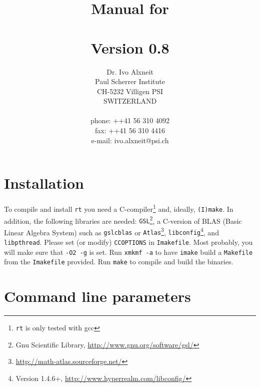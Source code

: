 \documentclass[10pt,a4paper,titlepage]{article}
\title{ {\Huge Manual for \\
		\rt \\
		Version 0.8\\
		\vspace{2cm}}}
\author{Dr. Ivo Alxneit \\
	Paul Scherrer Institute \\
	CH-5232 Villigen PSI \\
	SWITZERLAND \\
	\\
	phone: ++41 56 310 4092 \\
	fax: ++41 56 310 4416 \\
	e-mail: ivo.alxneit@psi.ch \\
	\vspace{4cm}}
\newcommand{\rt}{{\tt rt} }
\begin{document}
\maketitle

\tableofcontents
\pagebreak

\setcounter{page}{1}



\section{Installation}

To compile and install \rt you need a C-compiler\footnote{\rt is only tested with gcc} and, ideally, {\tt (I)make}. In addition, the following libraries are needed: {\tt GSL}\footnote{Gnu Scientific Library, \url{http://www.gnu.org/software/gsl/}}, a C-version of BLAS (Basic Linear Algebra System) such as {\tt gslcblas} or {\tt Atlas}\footnote{\url{http://math-atlas.sourceforge.net/}}, {\tt libconfig}\footnote{Version 1.4.6+, \url{http://www.hyperrealm.com/libconfig/}}, and {\tt libpthread}. Please set (or modify) {\tt CCOPTIONS} in {\tt Imakefile}. Most probably, you will make sure that {\tt -O2 -g} is set. Run {\tt xmkmf -a} to have {\tt imake} build a {\tt Makefile} from the {\tt Imakefile} provided. Run {\tt make} to compile and build the binaries.



\section{Command line parameters}
\end{document}

